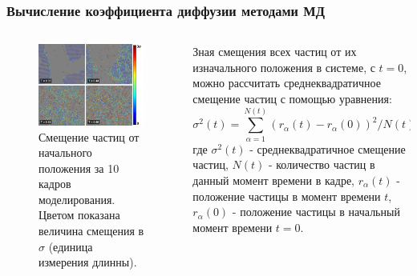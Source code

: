 \documentclass[pdf,hyperref={unicode}]{beamer}
\begin{document}
\begin{frame}
\transdissolve[duration=0.2]
\frametitle{Вычисление коэффициента диффузии методами МД}

\begin{columns}

\begin{column}{0.5\linewidth}

\begin{figure}[h]
\begin{center}
\includegraphics[width=\textwidth]{Diffusion}
\caption{\tiny Смещение частиц от начального положения за 10 кадров моделирования. Цветом показана величина смещения в $\sigma$ (единица измерения длинны).}
\label{risTreck}
\end{center}
\end{figure}

\end{column}
\begin{column}{0.5\linewidth}
\tiny{

Зная смещения всех частиц от их изначального положения в системе, с $t = 0$, можно рассчитать среднеквадратичное смещение частиц с помощью уравнения:
\begin{equation}
    \sigma^2(t) = \sum\limits_{\alpha = 1}^{N(t)} (r_{\alpha}(t) - r_{\alpha}(0))^2 / N(t),
    \label{eqRMS}
\end{equation}
где $\sigma^2(t)$ - среднеквадратичное смещение частиц, $N(t)$ - количество частиц в данный момент времени в кадре, $r_{\alpha}(t)$ - положение частицы в момент времени $t$, $r_{\alpha}(0)$ - положение частицы в начальный момент времени $t = 0$.

}
\end{column}

\end{columns}
\end{frame}
\end{document}
